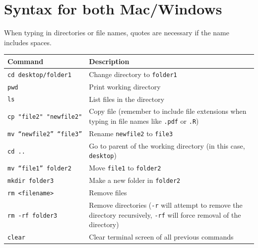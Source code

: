 \documentclass[
]{book}
\begin{document}
\hypertarget{syntax-for-both-macwindows}{%
\section{Syntax for both Mac/Windows}\label{syntax-for-both-macwindows}}

When typing in directories or file names, quotes are necessary if the name includes spaces.

\begin{longtable}[]{@{}
  >{\raggedright\arraybackslash}p{}
  >{\raggedright\arraybackslash}p{}@{}}
\toprule
Command & Description \\
\midrule
\endhead
\texttt{cd\ desktop/folder1} & Change directory to \texttt{folder1} \\
\texttt{pwd} & Print working directory \\
\texttt{ls} & List files in the directory \\
\texttt{cp\ "file2"\ "newfile2"} & Copy file (remember to include file extensions when typing in file names like \texttt{.pdf} or \texttt{.R}) \\
\texttt{mv\ “newfile2”\ “file3”} & Rename \texttt{newfile2} to \texttt{file3} \\
\texttt{cd\ ..} & Go to parent of the working directory (in this case, \texttt{desktop}) \\
\texttt{mv\ “file1”\ folder2} & Move \texttt{file1} to \texttt{folder2} \\
\texttt{mkdir\ folder3} & Make a new folder in \texttt{folder2} \\
\texttt{rm\ \textless{}filename\textgreater{}} & Remove files \\
\texttt{rm\ -rf\ folder3} & Remove directories (\texttt{-r} will attempt to remove the directory recursively, \texttt{-rf} will force removal of the directory) \\
\texttt{clear} & Clear terminal screen of all previous commands \\
\bottomrule
\end{longtable}
\end{document}
